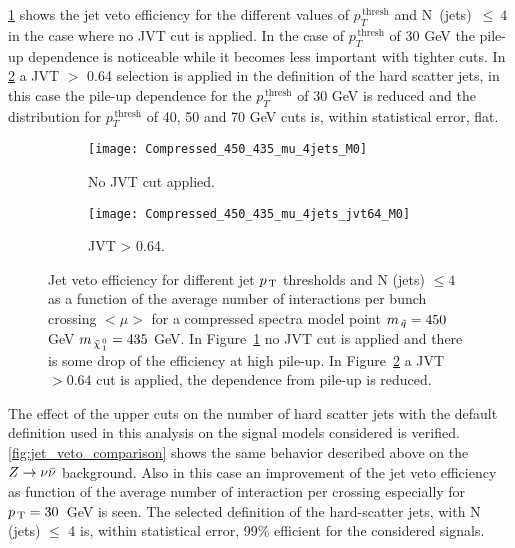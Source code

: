 \cref{fig:comp_4jets_nojvt} shows the jet veto efficiency for the different
values of $p_T^{\mathrm{\, thresh}}$ and N~(jets)~$\leq~4$ in the case where no
JVT cut is applied. In the case of $p_T^{\mathrm{\, thresh}}$ of 30 GeV the
pile-up dependence is noticeable while it becomes less important with tighter
cuts. In \cref{fig:comp_4jets_jvt64} a JVT $>$ 0.64 selection is applied in the
definition of the hard scatter jets, in this case the pile-up dependence for
the $p_T^{\mathrm{\, thresh}}$ of 30 GeV is reduced and the distribution for
$p_T^{\mathrm{\, thresh}}$ of 40, 50 and 70 GeV cuts is, within statistical
error, flat.
\begin{figure}[!h]
  \centering
  \begin{subfigure}[t]{.48\linewidth}
    \texttt{[image: Compressed\_450\_435\_mu\_4jets\_M0]}
    \caption{No JVT cut applied.}
    \label{fig:comp_4jets_nojvt}
  \end{subfigure}
  \begin{subfigure}[t]{.48\linewidth}
    \texttt{[image: Compressed\_450\_435\_mu\_4jets\_jvt64\_M0]}
    \caption{JVT > 0.64.}
    \label{fig:comp_4jets_jvt64}
  \end{subfigure}
  \caption{Jet veto efficiency for different jet $p_\mathrm{\, T}$ thresholds and N (jets)
    $\leq 4$ as a function of the average number of interactions per bunch
    crossing $<\mu>$ for a compressed spectra model point $m_{\, \tilde{q}} = 450$ GeV
    $m_{\, \tilde{\chi}_{\, 1}^{\, 0}} = 435$ GeV. In Figure~\ref{fig:comp_4jets_nojvt} no JVT cut is
    applied and there is some drop of the efficiency at high pile-up. In
    Figure~\ref{fig:comp_4jets_jvt64} a JVT $> 0.64$ cut is applied, the
    dependence from pile-up is reduced.}
  \label{fig:comp_eff}
\end{figure}
The effect of the upper cuts on the number of hard scatter jets with the default
definition used in this analysis on the signal models considered is
verified. \cref{fig:jet_veto_comparison} shows the same behavior described above
on the $Z \rightarrow \nu \bar{\nu}$ background. Also in this case an improvement of the jet veto
efficiency as function of the average number of interaction per crossing
especially for $p_\mathrm{\, T} = 30$~GeV is seen. The selected definition of the
hard-scatter jets, with N (jets) $\leq$ 4 is, within statistical error, 99\%
efficient for the considered signals.
